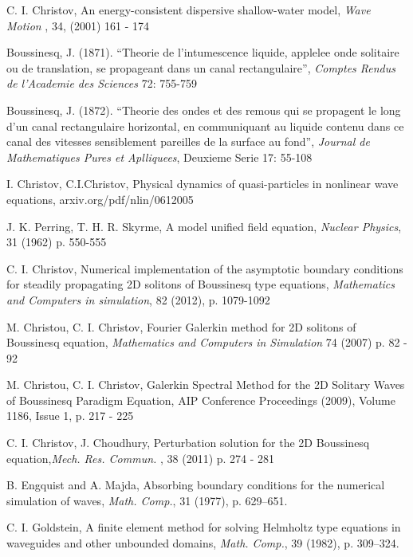 \documentclass[12pt]{article}
\theoremstyle{theorem}
\theoremstyle{defi}
\begin{document}
\begin{thebibliography}{99}

 C. I. Christov, An energy-consistent dispersive shallow-water model,  {\it Wave Motion }, 34, (2001) 161 - 174

 Boussinesq, J. (1871). “Theorie de l’intumescence liquide, applelee onde solitaire ou de translation, se propageant dans un canal rectangulaire”,  {\it Comptes Rendus de l’Academie des Sciences } 72: 755-759

 Boussinesq, J. (1872). “Theorie des ondes et des remous qui se propagent le long d’un canal rectangulaire horizontal, en communiquant au liquide contenu dans ce canal des vitesses sensiblement pareilles de la surface au fond”, {\it Journal de Mathematiques Pures et Aplliquees}, Deuxieme Serie 17: 55-108

 I. Christov, C.I.Christov, Physical dynamics of quasi-particles in nonlinear wave equations, arxiv.org/pdf/nlin/0612005

 J. K. Perring, T. H. R. Skyrme, A model unified field equation, {\it Nuclear Physics},  31 (1962) p. 550-555 

  C. I. Christov, Numerical implementation of the asymptotic boundary conditions for steadily propagating 2D solitons of Boussinesq type equations, {\it Mathematics and Computers in simulation}, 82 (2012), p. 1079-1092

  M. Christou, C. I. Christov, Fourier Galerkin method for 2D solitons of Boussinesq equation,  {\it Mathematics and Computers in Simulation} 74 (2007) p. 82 - 92

   M. Christou, C. I. Christov, Galerkin Spectral Method for the 2D Solitary Waves of Boussinesq Paradigm Equation, AIP Conference Proceedings (2009), Volume 1186, Issue 1, p. 217 - 225

 C. I. Christov, J. Choudhury, Perturbation solution for the 2D Boussinesq equation,{\it Mech. Res. Commun. }, 38 (2011) p. 274 - 281

 B. Engquist and A. Majda, Absorbing boundary conditions for the numerical simulation of waves, {\it Math. Comp.}, 31 (1977), p. 629–651.

  C. I. Goldstein, A finite element method for solving Helmholtz type equations in waveguides and other unbounded domains, {\it Math. Comp.}, 39 (1982), p. 309–324.


\end{thebibliography}
\end{document}

